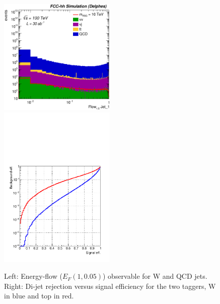 \documentclass{cernrep}
\begin{document}
\begin{figure}[!htb]\centering
\includegraphics[width=0.495\textwidth]{Fig/TMVA/Jet1_Flow15_sel0_nostack_logx.eps}
\includegraphics[width=0.495\textwidth,trim=0 0.5cm 0 0]{Fig/TMVA/effQCD_vs_effWhadBlue_thadRed_log.pdf}
\caption{Left: Energy-flow ($E_{F}(1,0.05)$) observable for W and QCD jets. Right: Di-jet rejection versus signal efficiency for the two taggers, W in blue and top in red.}
\label{fig:TMVA_final_result}
\end{figure}

\clearpage
\newpage

\end{document}

